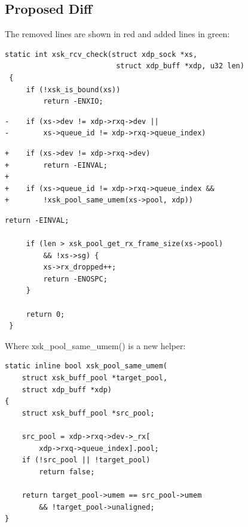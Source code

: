 \documentclass[11pt,a4paper]{article}
\renewcommand{\texttt}[1]{{\ttfamily\hyphenpenalty=10000\exhyphenpenalty=10000 #1}}
\begin{document}
\subsection{Proposed Diff}

The removed lines are shown in \colorbox{red!12}{red} and added lines in
\colorbox{green!12}{green}:

\begin{lstlisting}[caption={Proposed change to xsk\_rcv\_check().},
    label=lst:patch, numbers=none]
 static int xsk_rcv_check(struct xdp_sock *xs,
                          struct xdp_buff *xdp, u32 len)
 {
     if (!xsk_is_bound(xs))
         return -ENXIO;
\end{lstlisting}
\vspace{-1.2em}
\begin{lstlisting}[numbers=none, backgroundcolor=\color{red!12}]
-    if (xs->dev != xdp->rxq->dev ||
-        xs->queue_id != xdp->rxq->queue_index)
\end{lstlisting}
\vspace{-1.2em}
\begin{lstlisting}[numbers=none, backgroundcolor=\color{green!12}]
+    if (xs->dev != xdp->rxq->dev)
+        return -EINVAL;
+
+    if (xs->queue_id != xdp->rxq->queue_index &&
+        !xsk_pool_same_umem(xs->pool, xdp))
\end{lstlisting}
\vspace{-1.2em}
\begin{lstlisting}[numbers=none]
         return -EINVAL;

     if (len > xsk_pool_get_rx_frame_size(xs->pool)
         && !xs->sg) {
         xs->rx_dropped++;
         return -ENOSPC;
     }

     return 0;
 }
\end{lstlisting}

Where \texttt{xsk\_pool\_same\_umem()} is a new helper:

\begin{lstlisting}[caption={Helper to check shared UMEM between source and target.},
    label=lst:helper]
static inline bool xsk_pool_same_umem(
    struct xsk_buff_pool *target_pool,
    struct xdp_buff *xdp)
{
    struct xsk_buff_pool *src_pool;

    src_pool = xdp->rxq->dev->_rx[
        xdp->rxq->queue_index].pool;
    if (!src_pool || !target_pool)
        return false;

    return target_pool->umem == src_pool->umem
        && !target_pool->unaligned;
}
\end{lstlisting}
\end{document}
